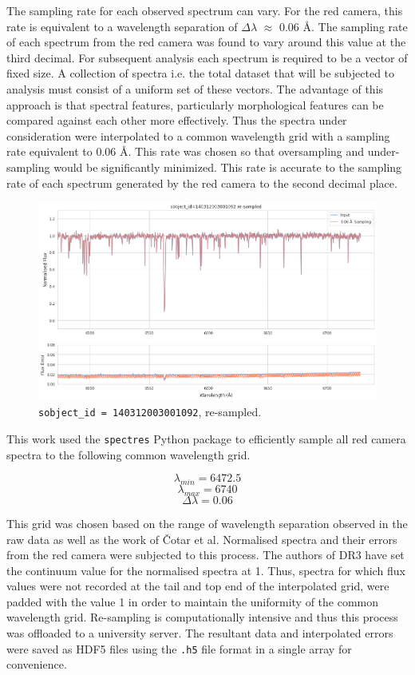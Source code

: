 The sampling rate for each observed spectrum can vary. For the red camera, this rate is equivalent to a wavelength separation of $\Delta\lambda$ $\approx$ 0.06 \r{A}\cite{vcotar2021galah}. The sampling rate of each spectrum from the red camera was found to vary around this value at the third decimal. For subsequent analysis each spectrum is required to be a vector of fixed size. A collection of spectra i.e. the total dataset that will be subjected to analysis must consist of a uniform set of these vectors. The advantage of this approach is that spectral features, particularly morphological features can be compared against each other more effectively. Thus the spectra under consideration were interpolated to a common wavelength grid with a sampling rate equivalent to 0.06 \r{A}. This rate was chosen so that oversampling and under-sampling would be significantly minimized. This rate is accurate to the sampling rate of each spectrum generated by the red camera to the second decimal place. 

\begin{figure}[!htb]
\centering
\includegraphics[scale=.40]{figures/resampling example.png}
\caption{\texttt{sobject\_id = 140312003001092}, re-sampled.}
\end{figure}

This work used the \texttt{spectres} Python package\cite{carnall2017spectres} to efficiently sample all red camera spectra to the following common wavelength grid.

\[\lambda_{min} = 6472.5\]
\[\lambda_{max} = 6740\]
\[\Delta\lambda = 0.06\]

This grid was chosen based on the range of wavelength separation observed in the raw data as well as the work of Čotar et al. Normalised spectra and their errors from the red camera were subjected to this process. The authors of DR3 have set the continuum value for the normalised spectra at 1. Thus, spectra for which flux values were not recorded at the tail and top end of the interpolated grid, were padded with the value 1 in order to maintain the uniformity of the common wavelength grid. Re-sampling is computationally intensive and thus this process was offloaded to a university server. The resultant data and interpolated errors were saved as HDF5 files using the \texttt{.h5} file format in a single array for convenience. 

